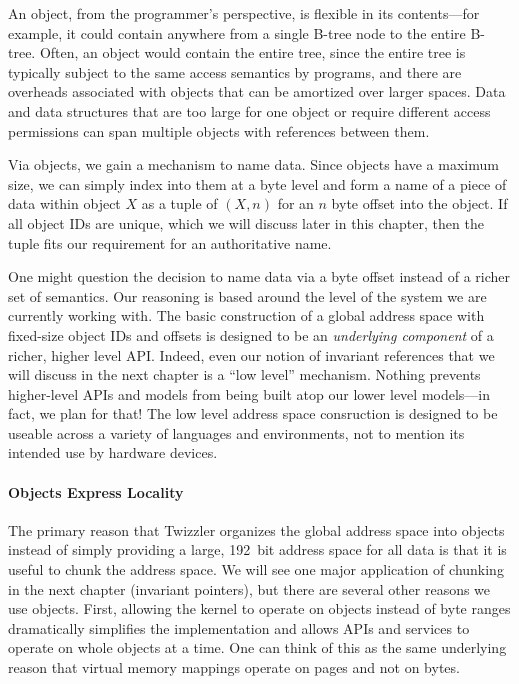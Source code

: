 
An object, from the programmer's perspective, is flexible in its
contents---for example, it could contain anywhere from a single B-tree node to the entire B-tree.
Often, an object would contain the entire tree, since the entire tree is typically subject to
the same access semantics by programs, and there are overheads associated with objects that can be
amortized over larger spaces. Data and data structures that are too large for one object or require
different access permissions can span multiple objects with references between them.

Via objects, we gain a mechanism to name data. Since objects have a maximum size, we can simply index into them at a
byte level and form a name of a piece of data within object $X$ as a tuple of $(X, n)$ for an $n$ byte offset into the
object. If all object IDs are unique, which we will discuss later in this chapter, then the tuple fits our requirement
for an authoritative name.

One might question the decision to name data via a byte offset instead of a richer set of semantics. Our reasoning is
based around the level of the system we are currently working with. The basic construction of a global address space
with fixed-size object IDs and offsets is designed to be an \emph{underlying component} of a richer, higher level API.
Indeed, even our notion of invariant references that we will discuss in the next chapter is a ``low level'' mechanism.
Nothing prevents higher-level APIs and models from being built atop our lower level models---in fact, we plan for that!
The low level address space consruction is designed to be useable across a variety of languages and environments, not to
mention its intended use by hardware devices.

\paragraph{Objects Express Locality}
The primary reason that Twizzler organizes the global address space into objects instead of simply providing a large,
192~bit address space for all data is that it is useful to chunk the address space. We will see one major application of
chunking in the next chapter (invariant pointers), but there are several other reasons we use objects. First, allowing
the kernel to operate on objects instead of byte ranges dramatically simplifies the implementation and allows APIs and
services to operate on whole objects at a time. One can think of this as the same underlying reason that virtual memory
mappings operate on pages and not on bytes.

